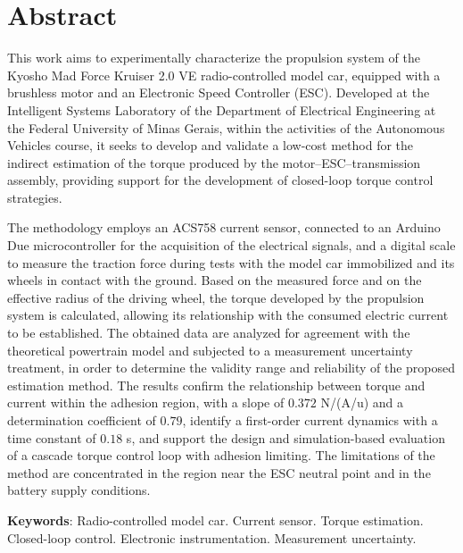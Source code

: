 \chapter*{Abstract}

This work aims to experimentally characterize the propulsion system of the Kyosho Mad Force
Kruiser 2.0 VE radio-controlled model car, equipped with a brushless motor and an Electronic
Speed Controller (ESC). Developed at the Intelligent Systems Laboratory of the Department of
Electrical Engineering at the Federal University of Minas Gerais, within the activities of the
Autonomous Vehicles course, it seeks to develop and validate a low-cost method for the indirect
estimation of the torque produced by the motor--ESC--transmission assembly, providing support
for the development of closed-loop torque control strategies.

The methodology employs an ACS758 current sensor, connected to an Arduino Due microcontroller
for the acquisition of the electrical signals, and a digital scale to measure the traction force
during tests with the model car immobilized and its wheels in contact with the ground. Based on
the measured force and on the effective radius of the driving wheel, the torque developed by the
propulsion system is calculated, allowing its relationship with the consumed electric current to
be established. The obtained data are analyzed for agreement with the theoretical powertrain
model and subjected to a measurement uncertainty treatment, in order to determine the validity
range and reliability of the proposed estimation method. The results confirm the relationship
between torque and current within the adhesion region, with a slope of $0.372$ N/(A/u) and a
determination coefficient of $0.79$, identify a first-order current dynamics with a time
constant of $0.18$ s, and support the design and simulation-based evaluation of a cascade
torque control loop with adhesion limiting. The limitations of the method are concentrated in
the region near the ESC neutral point and in the battery supply conditions.

\vspace{0.5cm}
\noindent\textbf{Keywords}: Radio-controlled model car. Current sensor. Torque estimation.
Closed-loop control. Electronic instrumentation. Measurement uncertainty.
